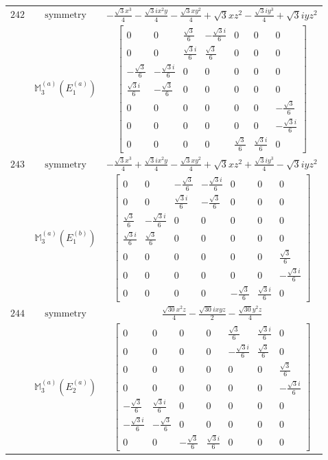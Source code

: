 \documentclass[fleqn,8pt,landscape]{jsarticle}
\begin{document}
\begin{longtable}{ccc}
$ 242 $ & $ \text{symmetry} $ & $ - \frac{\sqrt{3} x^{3}}{4} - \frac{\sqrt{3} i x^{2} y}{4} - \frac{\sqrt{3} x y^{2}}{4} + \sqrt{3} x z^{2} - \frac{\sqrt{3} i y^{3}}{4} + \sqrt{3} i y z^{2} $ \\
$  $ & $ \mathbb{M}_{3}^{(a)}(E_{1}^{(a)}) $ & $ \begin{bmatrix} 0 & 0 & \frac{\sqrt{3}}{6} & - \frac{\sqrt{3} i}{6} & 0 & 0 & 0 \\ 0 & 0 & \frac{\sqrt{3} i}{6} & \frac{\sqrt{3}}{6} & 0 & 0 & 0 \\ - \frac{\sqrt{3}}{6} & - \frac{\sqrt{3} i}{6} & 0 & 0 & 0 & 0 & 0 \\ \frac{\sqrt{3} i}{6} & - \frac{\sqrt{3}}{6} & 0 & 0 & 0 & 0 & 0 \\ 0 & 0 & 0 & 0 & 0 & 0 & - \frac{\sqrt{3}}{6} \\ 0 & 0 & 0 & 0 & 0 & 0 & - \frac{\sqrt{3} i}{6} \\ 0 & 0 & 0 & 0 & \frac{\sqrt{3}}{6} & \frac{\sqrt{3} i}{6} & 0 \end{bmatrix} $ \\ \hline
$ 243 $ & $ \text{symmetry} $ & $ - \frac{\sqrt{3} x^{3}}{4} + \frac{\sqrt{3} i x^{2} y}{4} - \frac{\sqrt{3} x y^{2}}{4} + \sqrt{3} x z^{2} + \frac{\sqrt{3} i y^{3}}{4} - \sqrt{3} i y z^{2} $ \\
$  $ & $ \mathbb{M}_{3}^{(a)}(E_{1}^{(b)}) $ & $ \begin{bmatrix} 0 & 0 & - \frac{\sqrt{3}}{6} & - \frac{\sqrt{3} i}{6} & 0 & 0 & 0 \\ 0 & 0 & \frac{\sqrt{3} i}{6} & - \frac{\sqrt{3}}{6} & 0 & 0 & 0 \\ \frac{\sqrt{3}}{6} & - \frac{\sqrt{3} i}{6} & 0 & 0 & 0 & 0 & 0 \\ \frac{\sqrt{3} i}{6} & \frac{\sqrt{3}}{6} & 0 & 0 & 0 & 0 & 0 \\ 0 & 0 & 0 & 0 & 0 & 0 & \frac{\sqrt{3}}{6} \\ 0 & 0 & 0 & 0 & 0 & 0 & - \frac{\sqrt{3} i}{6} \\ 0 & 0 & 0 & 0 & - \frac{\sqrt{3}}{6} & \frac{\sqrt{3} i}{6} & 0 \end{bmatrix} $ \\ \hline
$ 244 $ & $ \text{symmetry} $ & $ \frac{\sqrt{30} x^{2} z}{4} - \frac{\sqrt{30} i x y z}{2} - \frac{\sqrt{30} y^{2} z}{4} $ \\
$  $ & $ \mathbb{M}_{3}^{(a)}(E_{2}^{(a)}) $ & $ \begin{bmatrix} 0 & 0 & 0 & 0 & \frac{\sqrt{3}}{6} & \frac{\sqrt{3} i}{6} & 0 \\ 0 & 0 & 0 & 0 & - \frac{\sqrt{3} i}{6} & \frac{\sqrt{3}}{6} & 0 \\ 0 & 0 & 0 & 0 & 0 & 0 & \frac{\sqrt{3}}{6} \\ 0 & 0 & 0 & 0 & 0 & 0 & - \frac{\sqrt{3} i}{6} \\ - \frac{\sqrt{3}}{6} & \frac{\sqrt{3} i}{6} & 0 & 0 & 0 & 0 & 0 \\ - \frac{\sqrt{3} i}{6} & - \frac{\sqrt{3}}{6} & 0 & 0 & 0 & 0 & 0 \\ 0 & 0 & - \frac{\sqrt{3}}{6} & \frac{\sqrt{3} i}{6} & 0 & 0 & 0 \end{bmatrix} $ \\ \hline

\end{longtable}
\end{document}
